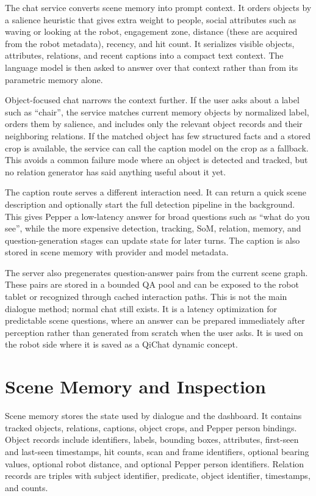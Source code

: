 The chat service converts scene memory into prompt context. It orders objects by a salience heuristic that gives extra weight to people, social attributes such as waving or looking at the robot, engagement zone, distance (these are acquired from the robot metadata), recency, and hit count. It serializes visible objects, attributes, relations, and recent captions into a compact text context. The language model is then asked to answer over that context rather than from its parametric memory alone.

Object-focused chat narrows the context further. If the user asks about a label such as \enquote{chair}, the service matches current memory objects by normalized label, orders them by salience, and includes only the relevant object records and their neighboring relations. If the matched object has few structured facts and a stored crop is available, the service can call the caption model on the crop as a fallback. This avoids a common failure mode where an object is detected and tracked, but no relation generator has said anything useful about it yet.

The caption route serves a different interaction need. It can return a quick scene description and optionally start the full detection pipeline in the background. This gives Pepper a low-latency answer for broad questions such as \enquote{what do you see}, while the more expensive detection, tracking, SoM, relation, memory, and question-generation stages can update state for later turns. The caption is also stored in scene memory with provider and model metadata.

The server also pregenerates question-answer pairs from the current scene graph. These pairs are stored in a bounded QA pool and can be exposed to the robot tablet or recognized through cached interaction paths. This is not the main dialogue method; normal chat still exists. It is a latency optimization for predictable scene questions, where an answer can be prepared immediately after perception rather than generated from scratch when the user asks. It is used on the robot side where it is saved as a QiChat dynamic concept.

\section{Scene Memory and Inspection}\label{sec:server-scene-memory}

Scene memory stores the state used by dialogue and the dashboard. It contains tracked objects, relations, captions, object crops, and Pepper person bindings. Object records include identifiers, labels, bounding boxes, attributes, first-seen and last-seen timestamps, hit counts, scan and frame identifiers, optional bearing values, optional robot distance, and optional Pepper person identifiers. Relation records are triples with subject identifier, predicate, object identifier, timestamps, and counts.

